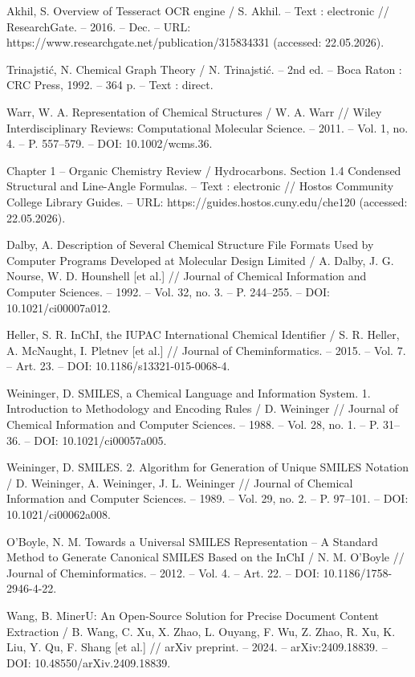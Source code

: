 Akhil, S. Overview of Tesseract OCR engine / S. Akhil. – Text : electronic // ResearchGate. – 2016. – Dec. – URL: https://www.researchgate.net/publication/315834331 (accessed: 22.05.2026).

Trinajstić, N. Chemical Graph Theory / N. Trinajstić. – 2nd ed. – Boca Raton : CRC Press, 1992. – 364 p. – Text : direct.

Warr, W. A. Representation of Chemical Structures / W. A. Warr // Wiley Interdisciplinary Reviews: Computational Molecular Science. – 2011. – Vol. 1, no. 4. – P. 557–579. – DOI: 10.1002/wcms.36.

Chapter 1 -- Organic Chemistry Review / Hydrocarbons. Section 1.4 Condensed Structural and Line-Angle Formulas. – Text : electronic // Hostos Community College Library Guides. – URL: https://guides.hostos.cuny.edu/che120 (accessed: 22.05.2026).

Dalby, A. Description of Several Chemical Structure File Formats Used by Computer Programs Developed at Molecular Design Limited / A. Dalby, J. G. Nourse, W. D. Hounshell [et al.] // Journal of Chemical Information and Computer Sciences. – 1992. – Vol. 32, no. 3. – P. 244–255. – DOI: 10.1021/ci00007a012.

Heller, S. R. InChI, the IUPAC International Chemical Identifier / S. R. Heller, A. McNaught, I. Pletnev [et al.] // Journal of Cheminformatics. – 2015. – Vol. 7. – Art. 23. – DOI: 10.1186/s13321-015-0068-4.

Weininger, D. SMILES, a Chemical Language and Information System. 1. Introduction to Methodology and Encoding Rules / D. Weininger // Journal of Chemical Information and Computer Sciences. – 1988. – Vol. 28, no. 1. – P. 31–36. – DOI: 10.1021/ci00057a005.

Weininger, D. SMILES. 2. Algorithm for Generation of Unique SMILES Notation / D. Weininger, A. Weininger, J. L. Weininger // Journal of Chemical Information and Computer Sciences. – 1989. – Vol. 29, no. 2. – P. 97–101. – DOI: 10.1021/ci00062a008.

O'Boyle, N. M. Towards a Universal SMILES Representation – A Standard Method to Generate Canonical SMILES Based on the InChI / N. M. O'Boyle // Journal of Cheminformatics. – 2012. – Vol. 4. – Art. 22. – DOI: 10.1186/1758-2946-4-22.

Wang, B. MinerU: An Open-Source Solution for Precise Document Content Extraction / B. Wang, C. Xu, X. Zhao, L. Ouyang, F. Wu, Z. Zhao, R. Xu, K. Liu, Y. Qu, F. Shang [et al.] // arXiv preprint. – 2024. – arXiv:2409.18839. – DOI: 10.48550/arXiv.2409.18839.

